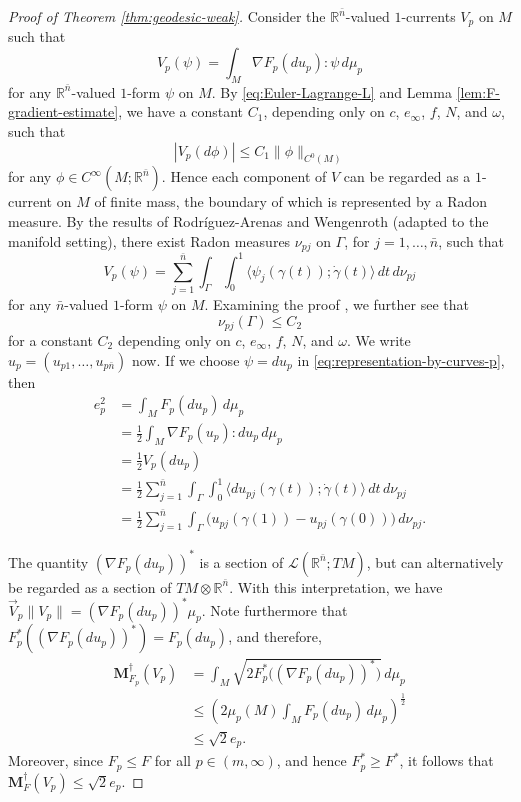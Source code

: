\documentclass[a4paper]{article}
\newcommand{\R}{\mathbb{R}}
\newcommand{\M}{\mathbf{M}}
\newcommand{\ndim}{{\bar{n}}}
\newcommand{\Lin}{\mathcal{L}}
\newcommand{\pairing}[2]{\langle #1; #2 \rangle}
\theoremstyle{definition}
\theoremstyle{remark}
\begin{document}
\begin{proof}[Proof of Theorem \ref{thm:geodesic-weak}]
Consider the $\R^\ndim$-valued $1$-currents $V_p$ on $M$
such that
\[
V_p(\psi) = \int_M \nabla F_p(du_p) : \psi \, d\mu_p
\]
for any $\R^\ndim$-valued $1$-form $\psi$ on $M$. By \eqref{eq:Euler-Lagrange-L}
and Lemma \ref{lem:F-gradient-estimate}, we have a constant $C_1$, depending only on $c$, $e_\infty$, $f$, $N$, and $\omega$, such that
\[
|V_p(d\phi)| \le C_1 \|\phi\|_{C^0(M)}
\]
for any $\phi \in C^\infty(M; \R^\ndim)$. Hence each component of $V$ can be regarded as a
$1$-current on $M$ of finite mass, the boundary of which is represented by a Radon measure. By the results of Rodr\'iguez-Arenas and Wengenroth \cite{Rodriguez-Arenas-Wengenroth:24} (adapted to the manifold setting), there exist Radon measures $\nu_{pj}$ on $\Gamma$, for $j = 1, \dotsc, \ndim$, such that
\begin{equation} \label{eq:representation-by-curves-p}
V_p(\psi) = \sum_{j = 1}^\ndim \int_\Gamma \int_0^1 \pairing{\psi_j(\gamma(t))}{\dot{\gamma}(t)} \, dt \, d\nu_{pj}
\end{equation}
for any $\ndim$-valued $1$-form $\psi$ on $M$. Examining the proof \cite[Section 4]{Rodriguez-Arenas-Wengenroth:24},
we further see that
\[
\nu_{pj}(\Gamma) \le C_2
\]
for a constant $C_2$ depending only on $c$, $e_\infty$, $f$, $N$, and $\omega$.
We write $u_p = (u_{p1}, \dotsc, u_{p\ndim})$ now.
If we choose $\psi = du_p$ in \eqref{eq:representation-by-curves-p}, then
\begin{equation} \label{eq:representation-by-curves2}
\begin{split}
e_p^2 &= \int_M F_p(du_p) \, d\mu_p \\
& = \frac{1}{2} \int_M \nabla F_p(u_p) : du_p \, d\mu_p \\
& = \frac{1}{2} V_p(du_p) \\
& = \frac{1}{2} \sum_{j = 1}^\ndim \int_\Gamma \int_0^1 \pairing{du_{pj}(\gamma(t))}{\dot{\gamma}(t)} \, dt \, d\nu_{pj} \\
& = \frac{1}{2} \sum_{j = 1}^\ndim \int_\Gamma \bigl(u_{pj}(\gamma(1)) - u_{pj}(\gamma(0))\bigr) \, d\nu_{pj}.
\end{split}
\end{equation}

The quantity $(\nabla F_p(du_p))^*$ is a section of $\Lin(\R^\ndim; TM)$, but
can alternatively be regarded as a section of $TM \otimes \R^\ndim$.
With this interpretation, we have $\vec{V}_p \|V_p\| = (\nabla F_p(du_p))^* \mu_p$.
Note furthermore that $F_p^*((\nabla F_p(du_p))^*) = F_p(du_p)$, and therefore,
\[
\begin{split}
\M_{F_p}^\dagger(V_p) & = \int_M \sqrt{2F_p^*\bigl((\nabla F_p(du_p))^*\bigr)} \, d\mu_p \\
& \le \left(2\mu_p(M) \int_M F_p(du_p) \, d\mu_p\right)^{\frac{1}{2}} \\
& \le \sqrt{2} e_p.
\end{split}
\]
Moreover, since $F_p \le F$ for all $p \in (m, \infty)$, and hence $F_p^* \ge F^*$, it follows that $\M_F^\dagger(V_p) \le \sqrt{2} e_p$.


\end{proof}
\end{document}
